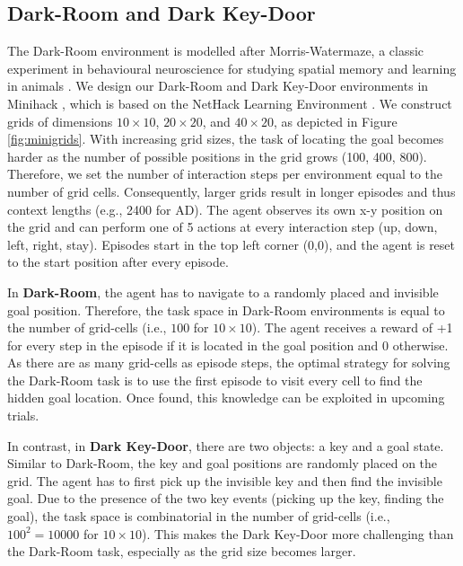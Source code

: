 \subsection{Dark-Room and Dark Key-Door} \label{appendix:env-data-dark}
The Dark-Room environment is modelled after Morris-Watermaze, a classic experiment in behavioural neuroscience for studying spatial memory and learning in animals \citep{Hooge:01}.
We design our Dark-Room and Dark Key-Door environments in Minihack \citep{Samvelyan:2021}, which is based on the NetHack Learning Environment \citep{kuttler2020nethack}.
We construct grids of dimensions $10\times 10$, $20\times20$, and $40\times20$, as depicted in Figure \ref{fig:minigrids}.
With increasing grid sizes, the task of locating the goal becomes harder as the number of possible positions in the grid grows (100, 400, 800).
Therefore, we set the number of interaction steps per environment equal to the number of grid cells. 
Consequently, larger grids result in longer episodes and thus context lengths (e.g., 2400 for AD).
The agent observes its own x-y position on the grid and can perform one of 5 actions at every interaction step (up, down, left, right, stay). 
Episodes start in the top left corner (0,0), and the agent is reset to the start position after every episode.

In \textbf{Dark-Room}, the agent has to navigate to a randomly placed and invisible goal position. 
Therefore, the task space in Dark-Room environments is equal to the number of grid-cells (i.e., $100$ for $10\times10$). 
The agent receives a reward of +1 for every step in the episode if it is located in the goal position and 0 otherwise. 
As there are as many grid-cells as episode steps, the optimal strategy for solving the Dark-Room task is to use the first episode to visit every cell to find the hidden goal location. 
Once found, this knowledge can be exploited in upcoming trials. 

In contrast, in \textbf{Dark Key-Door}, there are two objects: a key and a goal state. 
Similar to Dark-Room, the key and goal positions are randomly placed on the grid. 
The agent has to first pick up the invisible key and then find the invisible goal. 
Due to the presence of the two key events (picking up the key, finding the goal), the task space is combinatorial in the number of grid-cells (i.e., $100^2=10000$ for $10\times10$).
This makes the Dark Key-Door more challenging than the Dark-Room task, especially as the grid size becomes larger.

